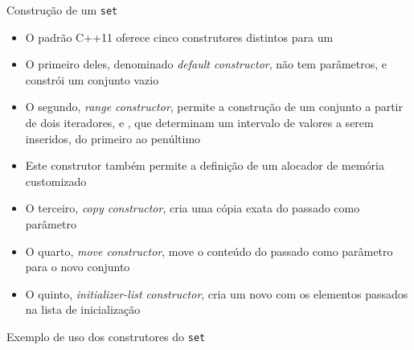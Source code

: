 \begin{frame}[fragile]{Construção de um \texttt{set}}

    \begin{itemize}
        \item O padrão C++11 oferece cinco construtores distintos para um 

        \item O primeiro deles, denominado \textit{default constructor},
                 não tem parâmetros, e constrói um conjunto vazio

        \item O segundo, \textit{range constructor}, permite a construção de um conjunto a partir 
            de dois iteradores,
             e , que determinam um intervalo de valores a 
            serem inseridos, do primeiro ao penúltimo

        \item Este construtor também permite a definição de um alocador de memória customizado

        \item O terceiro, \textit{copy constructor}, cria uma cópia exata do 
            passado como parâmetro

        \item O quarto, \textit{move constructor}, move o conteúdo do  passado
            como parâmetro para o novo conjunto

        \item O quinto, \textit{initializer-list constructor}, cria um novo  com
            os elementos passados na lista de inicialização
    \end{itemize}

\end{frame}

\begin{frame}[fragile]{Exemplo de uso dos construtores do \texttt{set}}


\end{frame}

